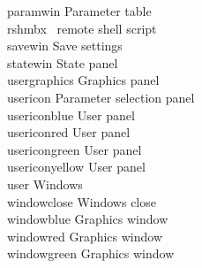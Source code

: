  paramwin Parameter table\\
 rshmbx \mbs\ remote shell script\\
 savewin Save settings\\
 statewin State panel\\
 usergraphics Graphics panel\\
 usericon Parameter selection panel\\
 usericonblue User panel\\
 usericonred User panel\\
 usericongreen User panel\\
 usericonyellow User panel\\
 user Windows\\
 windowclose Windows close\\
 windowblue Graphics window\\
 windowred Graphics window\\
 windowgreen Graphics window\\


